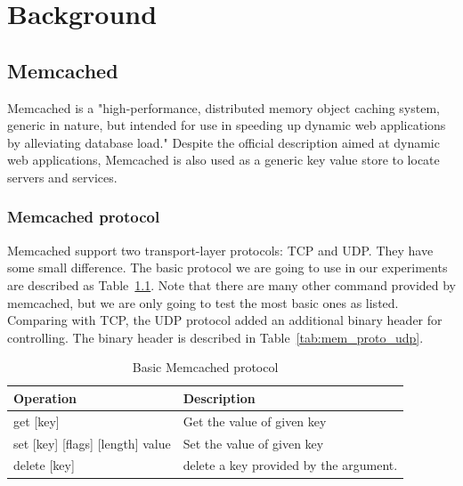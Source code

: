 \documentclass[bsc,frontabs,twoside,singlespacing,parskip,deptreport]{infthesis}     %
\begin{document}









\chapter{Background}

\section{Memcached}


Memcached is a "high-performance, distributed memory object caching system, generic in nature, but intended for use in speeding up dynamic web applications by alleviating database load." Despite the official description aimed at dynamic web applications, Memcached is also used as a generic key value store to locate servers and services. 

\subsection{Memcached protocol}

Memcached support two  transport-layer protocols: TCP and UDP. They have some small difference. The basic protocol we are going to use in our experiments are described as Table~\ref{tab:mem_proto}. Note that there are many other command provided by memcached, but we are only going to test the most basic ones as listed. Comparing with TCP, the UDP protocol added an additional binary header for controlling. The binary header is described in Table~\ref{tab:mem_proto_udp}.


\begin{table}[h]
\centering
\begin{tabular}{ |p{6cm}||p{6cm}|  }

 \hline
 Operation & Description \\
 \hline
get [key]  & Get the value of given key \\
 \hline
set [key] [flags] [length] value & Set the value of given key \\
 \hline
delete [key] & delete a key provided by the argument. \\
 \hline
 
\end{tabular}
\caption{Basic Memcached protocol}
\label{tab:mem_proto}


\end{table}
\end{document}

